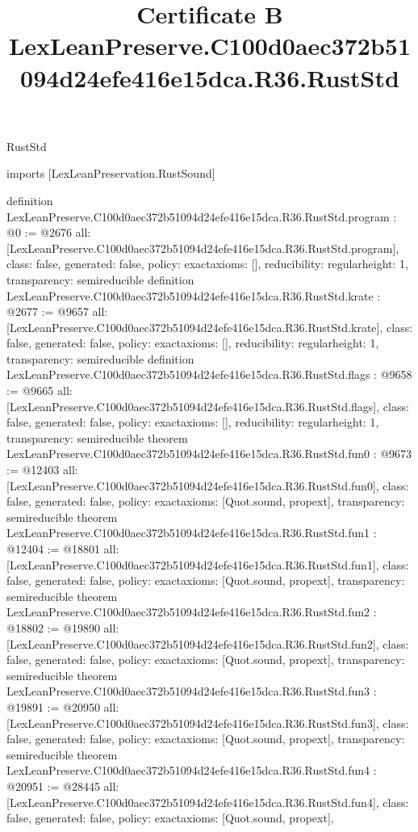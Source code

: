 \begin{lexlean}{RustStd}
\title{Certificate B LexLeanPreserve.C100d0aec372b51094d24efe416e15dca.R36.RustStd}
\begin{coremodule}
imports [LexLeanPreservation.RustSound]

definition LexLeanPreserve.C100d0aec372b51094d24efe416e15dca.R36.RustStd.program : @0 := @2676 {
  all: [LexLeanPreserve.C100d0aec372b51094d24efe416e15dca.R36.RustStd.program],
  class: false,
  generated: false,
  policy: exact{axioms: []},
  reducibility: regular{height: 1},
  transparency: semireducible
}
definition LexLeanPreserve.C100d0aec372b51094d24efe416e15dca.R36.RustStd.krate : @2677 := @9657 {
  all: [LexLeanPreserve.C100d0aec372b51094d24efe416e15dca.R36.RustStd.krate],
  class: false,
  generated: false,
  policy: exact{axioms: []},
  reducibility: regular{height: 1},
  transparency: semireducible
}
definition LexLeanPreserve.C100d0aec372b51094d24efe416e15dca.R36.RustStd.flags : @9658 := @9665 {
  all: [LexLeanPreserve.C100d0aec372b51094d24efe416e15dca.R36.RustStd.flags],
  class: false,
  generated: false,
  policy: exact{axioms: []},
  reducibility: regular{height: 1},
  transparency: semireducible
}
theorem LexLeanPreserve.C100d0aec372b51094d24efe416e15dca.R36.RustStd.fun0 : @9673 := @12403 {
  all: [LexLeanPreserve.C100d0aec372b51094d24efe416e15dca.R36.RustStd.fun0],
  class: false,
  generated: false,
  policy: exact{axioms: [Quot.sound, propext]},
  transparency: semireducible
}
theorem LexLeanPreserve.C100d0aec372b51094d24efe416e15dca.R36.RustStd.fun1 : @12404 := @18801 {
  all: [LexLeanPreserve.C100d0aec372b51094d24efe416e15dca.R36.RustStd.fun1],
  class: false,
  generated: false,
  policy: exact{axioms: [Quot.sound, propext]},
  transparency: semireducible
}
theorem LexLeanPreserve.C100d0aec372b51094d24efe416e15dca.R36.RustStd.fun2 : @18802 := @19890 {
  all: [LexLeanPreserve.C100d0aec372b51094d24efe416e15dca.R36.RustStd.fun2],
  class: false,
  generated: false,
  policy: exact{axioms: [Quot.sound, propext]},
  transparency: semireducible
}
theorem LexLeanPreserve.C100d0aec372b51094d24efe416e15dca.R36.RustStd.fun3 : @19891 := @20950 {
  all: [LexLeanPreserve.C100d0aec372b51094d24efe416e15dca.R36.RustStd.fun3],
  class: false,
  generated: false,
  policy: exact{axioms: [Quot.sound, propext]},
  transparency: semireducible
}
theorem LexLeanPreserve.C100d0aec372b51094d24efe416e15dca.R36.RustStd.fun4 : @20951 := @28445 {
  all: [LexLeanPreserve.C100d0aec372b51094d24efe416e15dca.R36.RustStd.fun4],
  class: false,
  generated: false,
  policy: exact{axioms: [Quot.sound, propext]},
}
\end{coremodule}
\end{lexlean}
